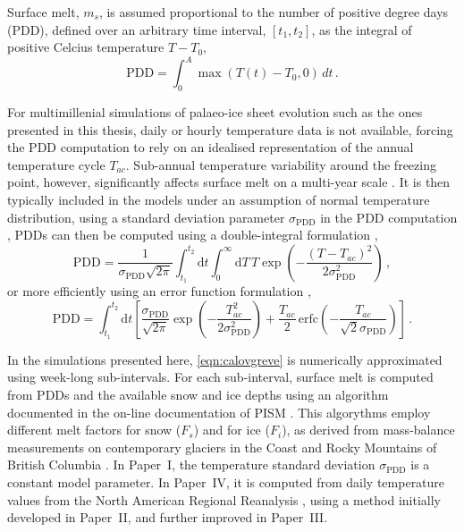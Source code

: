 \documentclass{article}
\newcommand{\PDD}[0]{\mathrm{PDD}}
\newcommand{\sPDD}[0]{\sigma_{\mathrm{PDD}}}
\newcommand{\unit}[1]{\ensuremath{\mathrm{#1}}}
\newcommand{\degree}[0]{\ensuremath{^{\circ}}}
\newcommand{\CCLI}[0]{Paper~I}      %
\newcommand{\PSDV}[0]{Paper~II}     %
\newcommand{\PSDP}[0]{Paper~III}    %
\newcommand{\CCYC}[0]{Paper~IV}     %
\begin{document}
Surface melt, $m_s$, is assumed proportional to the number of positive degree
days (PDD), defined over an arbitrary time interval, $[t_1, t_2]$, as the
integral of positive Celcius temperature $T-T_0$,
\begin{equation}
    \mathrm{PDD} = \int_{0}^{A}\max(T(t)-T_0,0)\,dt \,.
\end{equation}

For multimillenial simulations of palaeo-ice sheet evolution such as the ones
presented in this thesis, daily or hourly temperature data is not available,
forcing the PDD computation to rely on an idealised representation of the
annual temperature cycle $T_{ac}$. Sub-annual temperature variability around
the freezing point, however, significantly affects surface melt on a multi-year
scale \citep{Arnold.Mackay.1964}. It is then typically included in the models
under an assumption of normal temperature distribution, using a standard
deviation parameter $\sPDD$ in the PDD computation \citep{Braithwaite.1984},
PDDs can then be computed using a double-integral formulation
\citep{Reeh.1991},
\begin{equation}
    \PDD = \frac{1}{\sPDD\sqrt{2\pi}}
        \int_{t_1}^{t_2} \mathrm{d}t
        \int_{0}^{\infty} \mathrm{d}T \,
        T \exp\left({-\frac{(T-T_{ac})^2}{2\sPDD^2}}\right) \,,
\end{equation}
or more efficiently using an error function formulation
\citep{Calov.Greve.2005},
\begin{equation}
    \label{eqn:calovgreve}
    \PDD = \int_{t_1}^{t_2} \mathrm{d}t
        \left[\frac{\sPDD}{\sqrt{2\pi}}
                \exp\left({-\frac{T_{ac}^2}{2\sPDD^2}}\right)
              + \frac{T_{ac}}{2} \, \mathrm{erfc}
                \left(-\frac{T_{ac}}{\sqrt{2}\sPDD}\right)\right] \,.
\end{equation}

In the simulations presented here, \cref{eqn:calovgreve} is numerically
approximated using week-long sub-intervals. For each sub-interval, surface melt
is computed from PDDs and the available snow and ice depths using an algorithm
documented in the on-line documentation of PISM \citep{PISM-authors.2014}. This
algorythms employ different melt factors for snow ($F_s$) and for ice ($F_i$),
as derived from mass-balance measurements on contemporary glaciers in the
Coast and Rocky Mountains of British Columbia \citep{Shea.etal.2009}. In
{\CCLI}, the temperature standard deviation $\sPDD$ is a constant model
parameter. In {\CCYC}, it is computed from daily temperature values from the
North American Regional Reanalysis \citep[NARR,][]{Mesinger.etal.2006}, using
a method initially developed in {\PSDV}, and further improved in {\PSDP}.
\end{document}
